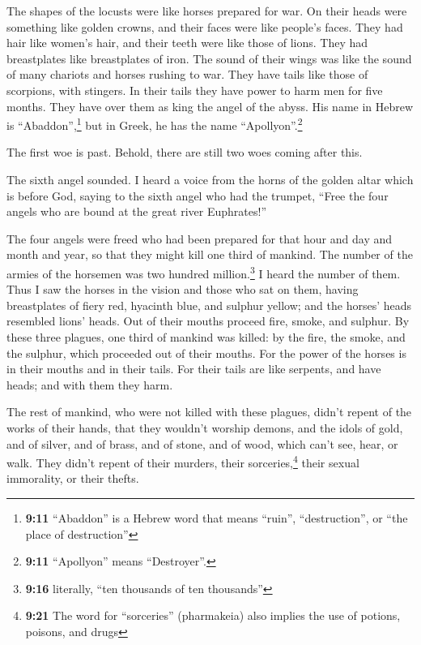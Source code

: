  The shapes of the locusts were like horses prepared for
war. On their heads were something like golden crowns, and their faces
were like people's faces.  They had hair like women's
hair, and their teeth were like those of lions.  They had
breastplates like breastplates of iron. The sound of their wings was
like the sound of many chariots and horses rushing to war.
 They have tails like those of scorpions, with stingers.
In their tails they have power to harm men for five months.
 They have over them as king the angel of the abyss. His
name in Hebrew is ``Abaddon'',\footnote{\textbf{9:11} ``Abaddon'' is a
  Hebrew word that means ``ruin'', ``destruction'', or ``the place of
  destruction''} but in Greek, he has the name ``Apollyon''.\footnote{\textbf{9:11}
  ``Apollyon'' means ``Destroyer''.}

 The first woe is past. Behold, there are still two woes
coming after this.

 The sixth angel sounded. I heard a voice from the horns
of the golden altar which is before God,  saying to the
sixth angel who had the trumpet, ``Free the four angels who are bound at
the great river Euphrates!''

 The four angels were freed who had been prepared for
that hour and day and month and year, so that they might kill one third
of mankind.  The number of the armies of the horsemen was
two hundred million.\footnote{\textbf{9:16} literally, ``ten thousands
  of ten thousands''} I heard the number of them.  Thus I
saw the horses in the vision and those who sat on them, having
breastplates of fiery red, hyacinth blue, and sulphur yellow; and the
horses' heads resembled lions' heads. Out of their mouths proceed fire,
smoke, and sulphur.  By these three plagues, one third of
mankind was killed: by the fire, the smoke, and the sulphur, which
proceeded out of their mouths.  For the power of the
horses is in their mouths and in their tails. For their tails are like
serpents, and have heads; and with them they harm.

 The rest of mankind, who were not killed with these
plagues, didn't repent of the works of their hands, that they wouldn't
worship demons, and the idols of gold, and of silver, and of brass, and
of stone, and of wood, which can't see, hear, or walk. 
They didn't repent of their murders, their sorceries,\footnote{\textbf{9:21}
  The word for ``sorceries'' (pharmakeia) also implies the use of
  potions, poisons, and drugs} their sexual immorality, or their thefts.

